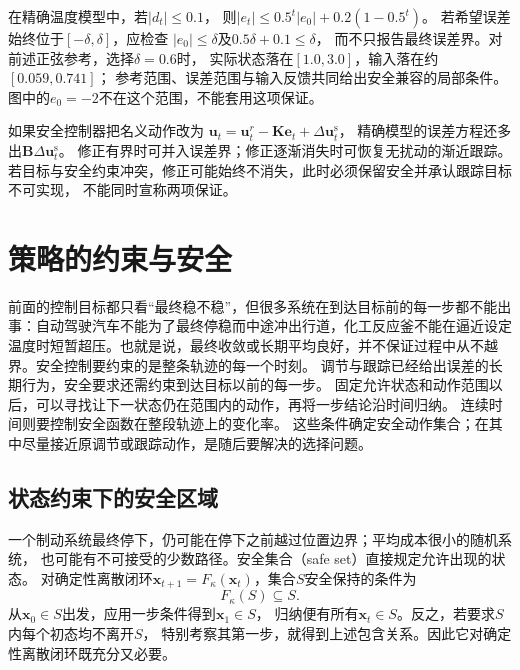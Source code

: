 在精确温度模型中，若$|d_t|\leq0.1$，
则$|e_t|\leq0.5^t|e_0|+0.2(1-0.5^t)$。
若希望误差始终位于$[-\delta,\delta]$，应检查
$|e_0|\leq\delta$及$0.5\delta+0.1\leq\delta$，
而不只报告最终误差界。对前述正弦参考，选择$\delta=0.6$时，
实际状态落在$[1.0,3.0]$，输入落在约$[0.059,0.741]$；
参考范围、误差范围与输入反馈共同给出安全兼容的局部条件。
图中的$e_0=-2$不在这个范围，不能套用这项保证。

如果安全控制器把名义动作改为
$\bm u_t=\bm u_t^r-\bm K\bm e_t+\Delta\bm u_t^{\mathrm s}$，
精确模型的误差方程还多出$\bm B\Delta\bm u_t^{\mathrm s}$。
修正有界时可并入误差界；修正逐渐消失时可恢复无扰动的渐近跟踪。
若目标与安全约束冲突，修正可能始终不消失，此时必须保留安全并承认跟踪目标不可实现，
不能同时宣称两项保证。

\section{策略的约束与安全}
\label{sec:control-safety-cbf}

前面的控制目标都只看“最终稳不稳”，但很多系统在到达目标前的每一步都不能出事：自动驾驶汽车不能为了最终停稳而中途冲出行道，化工反应釜不能在逼近设定温度时短暂超压。也就是说，最终收敛或长期平均良好，并不保证过程中从不越界。安全控制要约束的是整条轨迹的每一个时刻。
调节与跟踪已经给出误差的长期行为，安全要求还需约束到达目标以前的每一步。
固定允许状态和动作范围以后，可以寻找让下一状态仍在范围内的动作，再将一步结论沿时间归纳。
连续时间则要控制安全函数在整段轨迹上的变化率。
这些条件确定安全动作集合；在其中尽量接近原调节或跟踪动作，是随后要解决的选择问题。

\subsection{状态约束下的安全区域}
一个制动系统最终停下，仍可能在停下之前越过位置边界；平均成本很小的随机系统，
也可能有不可接受的少数路径。安全集合（safe set）直接规定允许出现的状态。
对确定性离散闭环$\bm x_{t+1}=F_\kappa(\bm x_t)$，集合$S$安全保持的条件为
\begin{equation}
  F_\kappa(S)\subseteq S.
  \label{eq:control-discrete-invariance}
\end{equation}
从$\bm x_0\in S$出发，应用一步条件得到$\bm x_1\in S$，
归纳便有所有$\bm x_t\in S$。反之，若要求$S$内每个初态均不离开$S$，
特别考察其第一步，就得到上述包含关系。因此它对确定性离散闭环既充分又必要。

